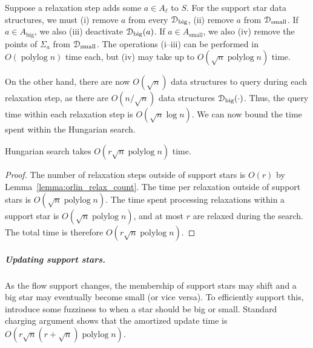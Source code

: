 \documentclass[a4paper,UKenglish]{socg-lipics-v2018}
\def\polylog{\mathop{\mathrm{polylog}}}
\theoremstyle{plain}
\numberwithin{figure}{section}
\renewcommand{\paragraph}{\subparagraph}
\begin{document}
Suppose a relaxation step adds some $a \in A_\ell$ to $S$.
For the support star data structures, we must
(i) remove $a$ from every $\EuScript{D}_\text{big}$,
(ii) remove $a$ from $\EuScript{D}_\text{small}$.
If $a \in A_\text{big}$, we also (iii) deactivate $\EuScript{D}_\text{big}(a)$.
If $a \in  A_\text{small}$, we also (iv) remove the points of $\Sigma_a$ from
$\EuScript{D}_\text{small}$.
The operations (i--iii) can be performed in $O(\polylog n)$ time
each, but (iv) may take up to $O(\sqrt{n}\polylog n)$ time.

On the other hand, there are now $O(\sqrt{n})$ data structures to query during
each relaxation step, as there are $O(n/\sqrt{n})$ data structures
$\EuScript{D}_\text{big}(\cdot)$.
Thus, the query time within each relaxation step is $O(\sqrt{n}\log n)$.
We can now bound the time spent within the Hungarian search.

\begin{lemmarep}
\label{lemma:orlin_hs_time}
Hungarian search takes $O(r\sqrt{n}\polylog n)$ time.
\end{lemmarep}

\begin{proof}
The number of relaxation steps outside of support stars is $O(r)$ by
Lemma~\ref{lemma:orlin_relax_count}.
The time per relaxation outside of support stars is $O(\sqrt{n}\polylog n)$.
The time spent processing relaxations within a support star is
$O(\sqrt{n}\polylog n)$, and at most $r$ are relaxed during the search.
The total time is therefore $O(r\sqrt{n}\polylog n)$.
\end{proof}

\paragraph{Updating support stars.}
As the flow support changes, the membership of support stars may shift and
a big star may eventually become small (or vice versa).
To efficiently support this, introduce some fuzziness to when a star should be big or small.
%
Standard charging argument shows that the amortized update time is $O(r\sqrt{n}(r+\sqrt{n})\polylog n)$.
\end{document}
